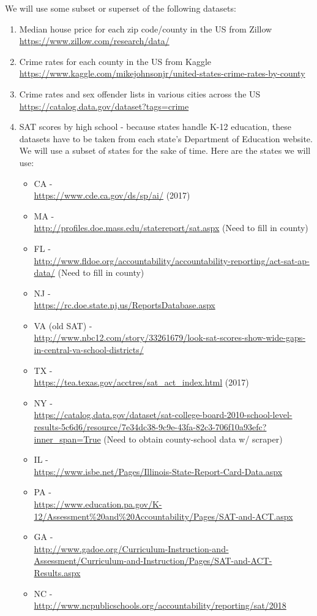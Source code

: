 \documentclass{article}
\begin{document}
We will use some subset or superset of the following datasets:
\begin{enumerate}
\item Median house price for each zip code/county in the US from Zillow \\ \url{https://www.zillow.com/research/data/}
\item Crime rates for each county in the US from Kaggle \\ \url{https://www.kaggle.com/mikejohnsonjr/united-states-crime-rates-by-county}
\item Crime rates and sex offender lists in various cities across the US \\ \url{https://catalog.data.gov/dataset?tags=crime} 
\item SAT scores by high school - because states handle K-12 education, these datasets have to be taken from each state’s Department of Education website. We will use a subset of states for the sake of time. Here are the states we will use:
\begin{itemize}
\item CA - \\ \url{https://www.cde.ca.gov/ds/sp/ai/} (2017)
\item MA - \\ \url{http://profiles.doe.mass.edu/statereport/sat.aspx} (Need to fill in county)
\item FL - \\ \url{http://www.fldoe.org/accountability/accountability-reporting/act-sat-ap-data/} (Need to fill in county)
\item NJ - \\ \url{https://rc.doe.state.nj.us/ReportsDatabase.aspx}
\item VA (old SAT) - \\ \url{http://www.nbc12.com/story/33261679/look-sat-scores-show-wide-gaps-in-central-va-school-districts/}
\item TX - \\ \url{https://tea.texas.gov/acctres/sat_act_index.html} (2017)

\item NY - \\ \url{https://catalog.data.gov/dataset/sat-college-board-2010-school-level-results-5c6d6/resource/7e34dc38-9c9e-43fa-82c3-706f10a93efc?inner_span=True} (Need to obtain county-school data w/ scraper)  
\item IL - \\ \url{https://www.isbe.net/Pages/Illinois-State-Report-Card-Data.aspx}
\item PA - \\ \url{https://www.education.pa.gov/K-12/Assessment\%20and\%20Accountability/Pages/SAT-and-ACT.aspx}
\item GA - \\ \url{http://www.gadoe.org/Curriculum-Instruction-and-Assessment/Curriculum-and-Instruction/Pages/SAT-and-ACT-Results.aspx}
\item NC - \\ \url{http://www.ncpublicschools.org/accountability/reporting/sat/2018}
\end{itemize}
\end{enumerate}
\end{document}
